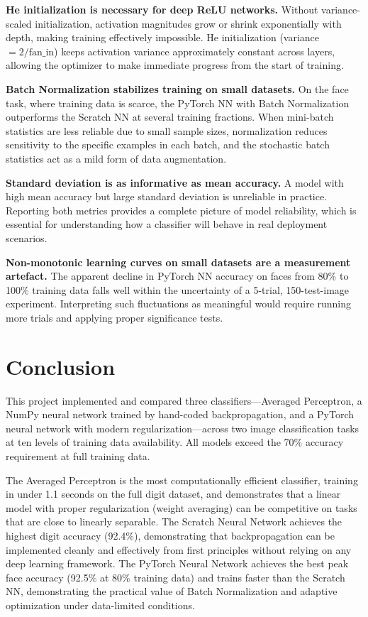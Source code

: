 \documentclass[12pt]{article}
\begin{document}
\textbf{He initialization is necessary for deep ReLU networks.} Without variance-scaled
initialization, activation magnitudes grow or shrink exponentially with depth, making
training effectively impossible. He initialization (variance $= 2/\text{fan\_in}$) keeps
activation variance approximately constant across layers, allowing the optimizer to make
immediate progress from the start of training.

\textbf{Batch Normalization stabilizes training on small datasets.} On the face task,
where training data is scarce, the PyTorch NN with Batch Normalization outperforms the
Scratch NN at several training fractions. When mini-batch statistics are less reliable
due to small sample sizes, normalization reduces sensitivity to the specific examples in
each batch, and the stochastic batch statistics act as a mild form of data augmentation.

\textbf{Standard deviation is as informative as mean accuracy.} A model with high mean
accuracy but large standard deviation is unreliable in practice. Reporting both metrics
provides a complete picture of model reliability, which is essential for understanding
how a classifier will behave in real deployment scenarios.

\textbf{Non-monotonic learning curves on small datasets are a measurement artefact.} The
apparent decline in PyTorch NN accuracy on faces from 80\% to 100\% training data falls
well within the uncertainty of a 5-trial, 150-test-image experiment. Interpreting such
fluctuations as meaningful would require running more trials and applying proper
significance tests.

\section{Conclusion}
\label{sec:conclusion}

This project implemented and compared three classifiers---Averaged Perceptron, a NumPy
neural network trained by hand-coded backpropagation, and a PyTorch neural network with
modern regularization---across two image classification tasks at ten levels of training
data availability. All models exceed the 70\% accuracy requirement at full training data.

The Averaged Perceptron is the most computationally efficient classifier, training in
under 1.1 seconds on the full digit dataset, and demonstrates that a linear model with
proper regularization (weight averaging) can be competitive on tasks that are close to
linearly separable. The Scratch Neural Network achieves the highest digit accuracy
(92.4\%), demonstrating that backpropagation can be implemented cleanly and effectively
from first principles without relying on any deep learning framework. The PyTorch Neural
Network achieves the best peak face accuracy (92.5\% at 80\% training data) and trains
faster than the Scratch NN, demonstrating the practical value of Batch Normalization and
adaptive optimization under data-limited conditions.
\end{document}

